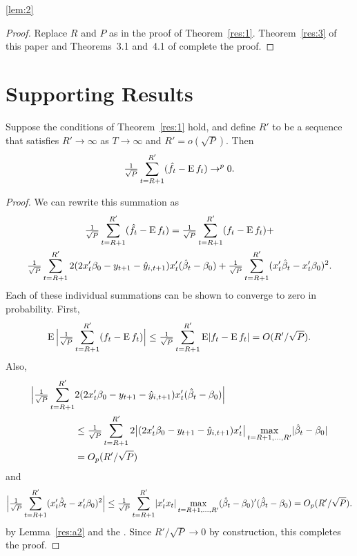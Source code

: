 \documentclass[12pt,fleqn]{article}
\begin{document}
\begin{rlem}{\ref{lem:2}}\end{rlem}
\begin{proof}
  Replace $R$ and $P$ as in the proof of Theorem~\ref{res:1}.
  Theorem~\ref{res:3} of this paper and Theorems~3.1 and~4.1 of
  \citet{RoW:05} complete the proof.
\end{proof}

\section*{Supporting Results}
\renewcommand\thesection{\Alph{section}}

\begin{alem}\label{res:a1}
  Suppose the conditions of Theorem~\ref{res:1} hold, and define $R'$
  to be a sequence that satisfies $R' \to \infty$ as $T \to \infty$
  and $R' = o(\sqrt{P})$. Then
  \begin{equation*}
    \tfrac{1}{\sqrt{P}} \sum_{t=R+1}^{R'} (\hat{f}_t - \operatorname{E} f_t) \to^p 0.
  \end{equation*}
\end{alem}

\begin{proof}
  We can rewrite this summation as
  \begin{multline*}
    \ocltc{t} (\fh_t - \E f_t) = \ocltc{t} (f_t - \E f_t) + \\
    \ocltc{t} 2 (2 x_t'\btrue - y_{t+1} - \yh_{i,t+1}) x_t'(\bh_t - \btrue)
    + \ocltc{t} (x_t'\bh_t - x_t'\btrue)^2.
  \end{multline*}
  Each of these individual summations can be shown to converge to
  zero in probability. First,
  \begin{equation*}
    \operatorname{E} \Big\lvert \tfrac{1}{\sqrt{P}} \sum_{t=R+1}^{R'} (f_t - \operatorname{E} f_t) \Big\rvert
    \leq \tfrac{1}{\sqrt{P}} \sum_{t=R+1}^{R'} \operatorname{E}\lvert f_t - \operatorname{E} f_t \rvert
    = O(R'/\sqrt{P}).
  \end{equation*}
  Also,
  \begin{align*}
    \Big\lvert \ocltc{t} &2 (2 x_t'\btrue - y_{t+1} - \yh_{i,t+1}) x_t'(\bh_t - \btrue) \Big\rvert \\
    &\leq \ocltc{t} 2 \big\lvert (2 x_t'\btrue - y_{t+1} - \yh_{i,t+1}) x_t' \big\rvert
    \max_{t=R+1,\dots,R'} \lvert  \bh_t - \btrue \rvert \\
    & = O_p(R'/\sqrt{P})
  \end{align*}
  and
  \begin{equation*}
    \Big\lvert \ocltc{t} (x_t'\bh_t - x_t'\btrue)^2 \Big\rvert
    \leq \ocltc{t} \lvert x_t'x_t \rvert \max_{t=R+1,\dots,R'} (\bh_t - \btrue)'(\bh_t - \btrue)
    = O_p(R'/\sqrt{P}).
  \end{equation*}
  by Lemma~\ref{res:a2} and the \lln. Since $R'/\sqrt{P} \to 0$ by
  construction, this completes the proof.
\end{proof}
\end{document}
